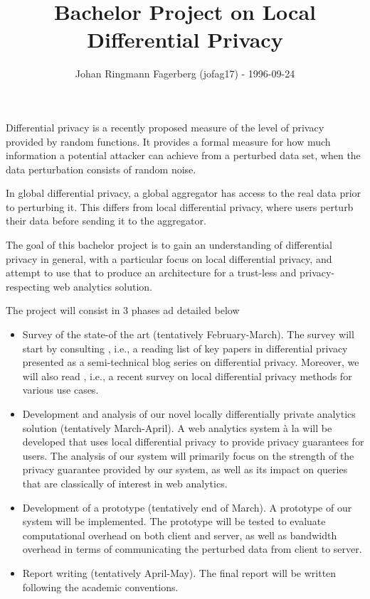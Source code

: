 \documentclass[a4paper]{article}
\title{\vspace{-2cm}Bachelor Project on Local Differential Privacy}
\author{Johan Ringmann Fagerberg (jofag17) - 1996-09-24}
\date{}
\begin{document}
\maketitle

\begin{description}[style=nextline]
    \item[Motivation] Differential privacy is a recently proposed measure of the level of privacy provided by random functions. It provides a formal measure for how much information a potential attacker can achieve from a perturbed data set, when the data perturbation consists of random noise.
    
    In global differential privacy, a global aggregator has access to the real data prior to perturbing it. This differs from local differential privacy, where users perturb their data before sending it to the aggregator.
    
    The goal of this bachelor project is to gain an understanding of 
differential privacy in general, with a particular focus on local differential 
privacy, and attempt to use that to produce an architecture for a trust-less 
and privacy-respecting web analytics solution.

\item[Plan]
    The project will consist in 3 phases ad detailed below
    \begin{itemize}
     \item Survey of the state-of the art (tentatively February-March). 
The survey will start by consulting \cite{desfontain_overview}, i.e., a reading 
list of key papers in differential privacy presented as a semi-technical blog 
series on differential privacy. Moreover, we will also read 
\cite{localdiffpriv_survey}, i.e., a recent survey on local differential privacy 
methods for various use cases.
     \item Development and analysis of our novel locally differentially private 
     analytics solution (tentatively March-April). A web analytics system à la 
     \cite{webanalytics_2012}
     will be developed that uses local differential privacy to provide privacy 
     guarantees for users. The analysis of our system will primarily focus on 
     the strength of the privacy guarantee provided by our system, as well as 
     its impact on queries that are classically of interest in web analytics.
     \item Development of a prototype (tentatively end of March). A prototype
     of our system will be implemented. The prototype will be tested to evaluate 
     computational overhead on both client and server, as well as bandwidth 
     overhead in terms of communicating the perturbed data from client to server.
\item
Report writing (tentatively April-May). The final report will be written 
following the academic conventions.
    \end{itemize}
    

\end{description}
\end{document}
